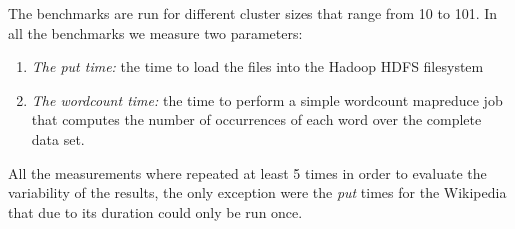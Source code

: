 The benchmarks are run for different cluster sizes that range from 10 to 101. In all the benchmarks we measure two parameters:
\begin{enumerate}
\item \emph{The put time:} the time to load the files into the Hadoop HDFS filesystem 
\item \emph{The wordcount time:} the time to perform a simple wordcount mapreduce job that computes the number of occurrences of each word over the complete data set. 
\end{enumerate}
All the measurements where repeated at least 5 times in order to evaluate the variability of the results, the only exception were the \emph{put} times for the Wikipedia that due to its duration could only be run once.


